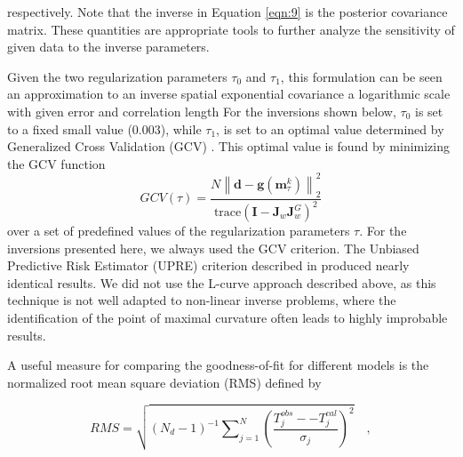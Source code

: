 \documentclass[cp]{copernicus}
\begin{document}
respectively. Note that the inverse in Equation \ref{eqn:9} is the posterior covariance matrix. 
These quantities are appropriate tools to further analyze the sensitivity of given data to the 
inverse parameters. 

Given the two regularization parameters $\tau_0$ and $\tau_1$, this formulation can be seen an 
approximation to an inverse spatial exponential covariance a logarithmic scale with given error and 
correlation length \citep{Rodgers2000a, Tarantola2005a} For the inversions shown below, $\tau_0$ is 
set to a fixed small value (0.003), while $\tau_1$, is set to an optimal value determined by 
Generalized Cross Validation (GCV) \citep{Rath2007a,Farquharson2004a,Wahba1990a}. This optimal value 
is found by minimizing the GCV function 
\begin{equation}\label{eqn:10}
GCV(\tau ) = \frac
{N\left\| \mathbf{d} - \mathbf{g}(\mathbf{m}_\tau ^k) \right\|_2^2}
{\text{trace}
\left(\mathbf{I} - \mathbf{J}_w^{}\mathbf{J}_w^G \right)^2} 
\end{equation} 
\noindent over a set of predefined values of the regularization parameters $\tau$. For the 
inversions presented here, we always used the GCV criterion. The Unbiased Predictive Risk Estimator 
(UPRE) criterion described in \citet{Vogel2002a} produced nearly identical results. We did not use 
the L-curve approach described above, as this technique is not well adapted to non-linear inverse 
problems, where the identification of the point of maximal curvature often leads to highly 
improbable results. 

A useful measure for comparing the goodness-of-fit for different models is the normalized root mean 
square deviation (RMS) defined by
 
\begin{equation}\label{eqn:11}
RMS = \sqrt {\left( {{N_d} - 1} \right)_{}^{ - 1}\sum\nolimits_{j = 1}^N 
{{{\left( {\frac{{T_j^{obs}--T_j^{cal}}}{{{\sigma _j}}}} \right)}^2}} } \quad ,
\end{equation} 
\end{document}
